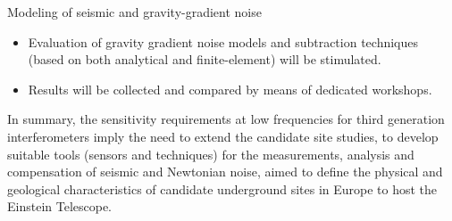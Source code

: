 Modeling of seismic and gravity-gradient noise 
\begin{itemize} 
\item{} Evaluation of gravity gradient noise models and subtraction techniques (based on both analytical and finite-element) will be stimulated. 
\item{} Results will be collected and compared by means of dedicated workshops. 
\end{itemize}

In summary, the sensitivity requirements at low frequencies for third generation interferometers imply the need to extend the candidate site studies, to develop suitable tools (sensors and techniques) for the measurements, analysis and compensation of seismic and Newtonian noise, aimed to define the physical and geological characteristics of candidate underground sites in Europe to host the Einstein Telescope.




